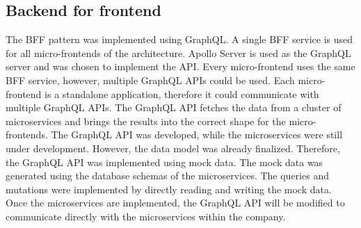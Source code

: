 \subsection{Backend for frontend}\label{subsection:background:prototypical-implemenation:bff}

The \ac{BFF} pattern was implemented using GraphQL. A single \ac{BFF} service is used for all micro-frontends of the architecture. Apollo Server is used as the GraphQL server and was chosen to implement the \ac{API}. Every micro-frontend uses the same \ac{BFF} service, however, multiple GraphQL \acp{API} could be used. Each micro-frontend is a standalone application, therefore it could communicate with multiple GraphQL \acp{API}.
The GraphQL \ac{API} fetches the data from a cluster of microservices and brings the results into the correct shape for the micro-frontends. The GraphQL \ac{API} was developed, while the microservices were still under development. However, the data model was already finalized. Therefore, the GraphQL \ac{API} was implemented using mock data. The mock data was generated using the database schemas of the microservices. The queries and mutations were implemented by directly reading and writing the mock data. Once the microservices are implemented, the GraphQL \ac{API} will be modified to communicate directly with the microservices within the company.

